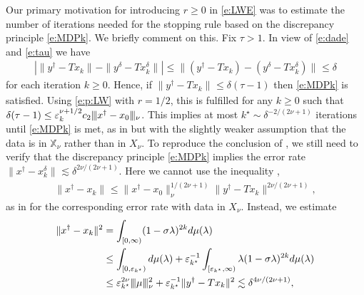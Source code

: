 \documentclass[10pt, a4paper]{iopart}
\newcommand{\IX}{\mathbb{X}}
\newcommand{\norm}[2]{     \| #1       \|_{ #2 }}
\newcommand{\normiii}[2]{\vert\kern-0.25ex\vert\kern-0.25ex\vert #1 \vert\kern-0.25ex \vert\kern-0.25ex\vert_{ #2 }}
\theoremstyle{remark}
\theoremstyle{definition}
\begin{document}
%

%

%
%
Our primary motivation for introducing $r \geq 0$ in \eqref{e:LWE}
was to estimate the number of iterations needed
for
the stopping rule based on the discrepancy principle \eqref{e:MDPk}.
%
We briefly comment on this.
%
Fix $\tau > 1$.
%
%
In view of \eqref{e:dade} and \eqref{e:tau}
we have
\begin{align}
	\left|
		\norm{y^\dag - T x_k}{}
		-
		\norm{y^\delta - T x_k^\delta }{}
	\right|
	\leq
	\norm{ (y^\dag - T x_k) - (y^\delta - T x_k^\delta) }{}
	\leq
	\delta
\end{align}
for each iteration $k \geq 0$.
%
Hence, if 
$\norm{ y^\dag - T x_k }{} \leq \delta (\tau - 1)$
then \eqref{e:MDPk} is satisfied.
%
Using \eqref{e:p:LW} with $r = 1/2$,
this is fulfilled
for any $k \geq 0$ such that
$ %
	\delta (\tau - 1)
	\leq
	{\varepsilon}_k^{\nu + 1/2}
	c_2
	\normiii{x^\dag - x_0}{\nu}
$. %
%
%
This implies at most $k^\star \sim \delta^{-2 / (2 \nu + 1)}$ 
iterations
until \eqref{e:MDPk} is met,
as in \cite[Theorem 6.5]{EnglHankeNeubauer1996}
but with the slightly weaker assumption that 
the data 
is in $\IX_\nu$ rather than in $X_\nu$.
%
%
To reproduce the conclusion of \cite[Theorem 6.5]{EnglHankeNeubauer1996},
we still need to verify that
the discrepancy principle \eqref{e:MDPk} implies
the error rate
$\norm{ x^\dag - x_k^\delta }{} \lesssim \delta^{2 \nu / (2 \nu + 1)}$.
%
Here we cannot use 
the inequality 
\cite[(4.66)]{EnglHankeNeubauer1996},
\begin{align}
	\norm{ x^\dag - x_k }{}
	\leq
	\norm{ x^\dag - x_0 }{\nu}^{1 / (2 \nu + 1)} 
	\norm{ y^\dag - T x_k }{}^{2 \nu / (2 \nu + 1)}
	,
\end{align}
as in \cite[Proof of Theorem 6.5]{EnglHankeNeubauer1996}
for
the corresponding error rate
with data in $X_\nu$.
%
Instead, we estimate
\begin{align}
	\norm{ x^\dag - x_k }{}^2
	& =
	\int_{[0, \infty)} (1 - \sigma \lambda)^{2k} d\mu(\lambda)
\\
	& 
	\leq
	\int_{[0, \varepsilon_{k^\star})} d\mu(\lambda)
	+
	\varepsilon_{k^\star}^{-1}
	\int_{[\varepsilon_{k^\star}, \infty)} \lambda (1 - \sigma \lambda)^{2k} d\mu(\lambda)
\\
	& 
	\leq
	\varepsilon_{k^\star}^{2 \nu}
	\normiii{\mu}{\nu}^2
	+
	\varepsilon_{k^\star}^{-1}
	\norm{ y^\dag - T x_k }{}^2
	\lesssim
	\delta^{4 \nu / (2 \nu + 1)}
	,
\end{align}
\end{document}
